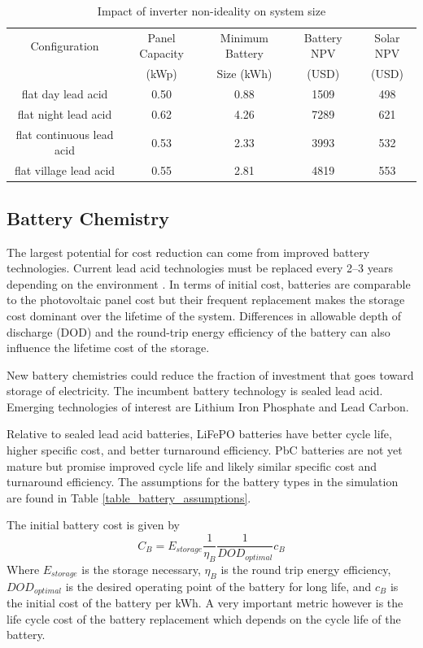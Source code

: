 \documentclass[conference]{IEEEtran}
\begin{document}
\begin{table}
\centering
\begin{tabular}{c c c c c}
Configuration & Panel Capacity & Minimum Battery & Battery NPV & Solar NPV \\
              & (kWp)          & Size (kWh)      & (USD)       & (USD)     \\
\hline
flat day lead acid             & 0.50 & 0.88 & 1509 & 498 \\
flat night lead acid           & 0.62 & 4.26 & 7289 & 621 \\
flat continuous lead acid      & 0.53 & 2.33 & 3993 & 532 \\
flat village lead acid         & 0.55 & 2.81 & 4819 & 553 \\
\end{tabular}
\caption{Impact of inverter non-ideality on system size}
\label{table_inverter}
\end{table}

\subsection{Battery Chemistry}

The largest potential for cost reduction can come from improved
battery technologies.
Current lead acid technologies must be replaced every 2--3 years
depending on the environment \cite{lead acid battery life}.
In terms of initial cost, batteries are comparable to the photovoltaic
panel cost but their frequent replacement makes the storage cost
dominant over the lifetime of the system.
Differences in allowable depth of discharge (DOD) and the round-trip
energy efficiency of the battery can also influence the lifetime
cost of the storage.

New battery chemistries could reduce the fraction of investment
that goes toward storage of electricity.
The incumbent battery technology is sealed lead acid.
Emerging technologies of interest are Lithium Iron Phosphate
and Lead Carbon.

Relative to sealed lead acid batteries, LiFePO batteries 
have better cycle life, higher specific cost, and better
turnaround efficiency.
PbC batteries are not yet mature but promise improved cycle
life and likely similar specific cost and turnaround
efficiency.
The assumptions for the battery types in the simulation
are found in Table \ref{table_battery_assumptions}.

The initial battery cost is given by
%
$$ C_B = E_{storage} \frac{1}{\eta_B} \frac{1}{DOD_{optimal}} c_B $$
%
Where $E_{storage}$ is the storage necessary, $\eta_B$ is the
round trip energy efficiency, $DOD_{optimal}$ is the desired
operating point of the battery for long life, and $c_B$ is the
initial cost of the battery per kWh.
A very important metric however is the life cycle cost of the 
battery replacement which depends on the cycle life of the battery.
\end{document}
